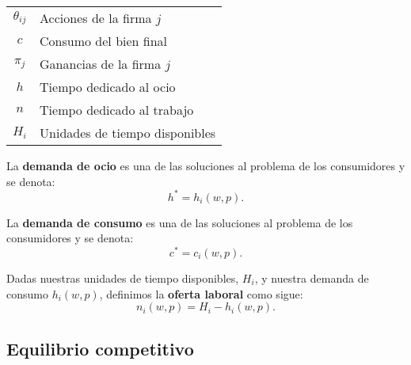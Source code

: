 \documentclass[8pt,a4paper]{extarticle}
\begin{document}
\begin{multicols}{3}
	\begin{center}
		\begin{tabular}{ c l }
			\hline
			$\theta_{ij}$ & Acciones de la firma $j$       \\
			$c$           & Consumo del bien final         \\
			$\pi_j$       & Ganancias de la firma $j$      \\
			$h$           & Tiempo dedicado al ocio        \\
			$n$           & Tiempo dedicado al trabajo     \\
			$H_i$         & Unidades de tiempo disponibles \\
			\hline
		\end{tabular}
	\end{center}

	\sectionbreak

	\begin{boxdef}
		La \textbf{demanda de ocio} es una de las soluciones al problema de los consumidores y se denota:
		\[
			h^* = h_i(w, p)
			.\]
	\end{boxdef}

	\begin{boxdef}
		La \textbf{demanda de consumo} es una de las soluciones al problema de los consumidores y se denota:
		\[
			c^* = c_i(w, p)
			.\]
	\end{boxdef}

	\begin{boxdef}
		Dadas nuestras unidades de tiempo disponibles, $H_i$, y nuestra demanda de consumo $h_i(w, p)$, definimos la \textbf{oferta laboral} como sigue:
		\[
			n_i(w, p) = H_i - h_i(w, p)
			.\]
	\end{boxdef}

	\subsection{Equilibrio competitivo}


\end{multicols}
\end{document}
